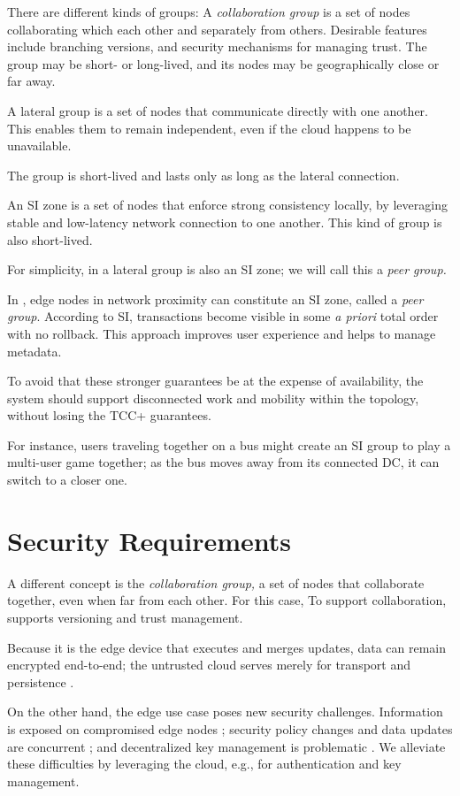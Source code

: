 There are different kinds of groups:
A \emph{collaboration group} is a set of nodes collaborating which each
other and separately from others.
Desirable features include branching versions, and security
mechanisms for managing trust.
The group may be short- or long-lived, and its nodes may be
geographically close or far away.

A {lateral group} is a set of nodes that communicate directly
with one another.
This enables them to remain independent, even if the cloud happens to be
unavailable.

The group is short-lived and lasts only as long as the lateral
connection.

An {SI zone} is a set of nodes that enforce strong consistency
locally, by leveraging  stable and low-latency network connection to
one another.
This kind of group is also short-lived.

For simplicity, in \system{} a lateral group is also an SI zone; we will
call this a \emph{peer group.}

In \system{}, edge nodes in network proximity can
constitute an SI zone, called a \emph{peer group}.
According to SI, transactions become visible in some \emph{a priori}
total order with no rollback.
This approach improves user experience and helps to manage metadata.

To avoid that these stronger guarantees be at the expense of
availability, the system should support disconnected work and mobility
within the topology, without losing the TCC+ guarantees.

For instance, users traveling together on a bus might create an SI
group to play a multi-user game together; as the bus moves away from
its connected DC, it can switch to a closer one.

\section{Security Requirements}
\label{sec:secur-requ}

A different concept is the \emph{collaboration group,} a set of nodes
that collaborate together, even when far from each other.
For this
case, 
To support collaboration, 
\system{} supports versioning and trust management.

Because it is the edge device that executes and merges updates, data can
remain encrypted end-to-end; the untrusted cloud serves merely for
transport and persistence \cite{sec:rep:1823}.

On the other hand, the edge use case poses new security challenges.
Information is exposed on compromised edge nodes \cite{syn:sec:1838};
security policy changes and data updates are concurrent
\cite{rep:sec:1692, sec:rep:1786}; and decentralized key management is
problematic \cite{sec:rep:1823}.
We alleviate these difficulties by leveraging the cloud, e.g., for
authentication and key management.

